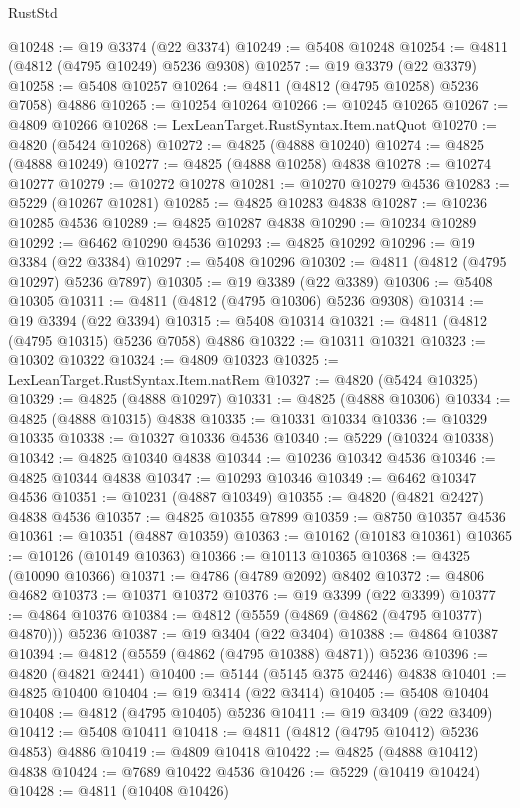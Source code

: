 \begin{lexlean}{RustStd}
\begin{coremodule}
@10248 := @19 @3374 (@22 @3374)
@10249 := @5408 @10248
@10254 := @4811 (@4812 (@4795 @10249) @5236 @9308)
@10257 := @19 @3379 (@22 @3379)
@10258 := @5408 @10257
@10264 := @4811 (@4812 (@4795 @10258) @5236 @7058) @4886
@10265 := @10254 @10264
@10266 := @10245 @10265
@10267 := @4809 @10266
@10268 := LexLeanTarget.RustSyntax.Item.natQuot
@10270 := @4820 (@5424 @10268)
@10272 := @4825 (@4888 @10240)
@10274 := @4825 (@4888 @10249)
@10277 := @4825 (@4888 @10258) @4838
@10278 := @10274 @10277
@10279 := @10272 @10278
@10281 := @10270 @10279 @4536
@10283 := @5229 (@10267 @10281)
@10285 := @4825 @10283 @4838
@10287 := @10236 @10285 @4536
@10289 := @4825 @10287 @4838
@10290 := @10234 @10289
@10292 := @6462 @10290 @4536
@10293 := @4825 @10292
@10296 := @19 @3384 (@22 @3384)
@10297 := @5408 @10296
@10302 := @4811 (@4812 (@4795 @10297) @5236 @7897)
@10305 := @19 @3389 (@22 @3389)
@10306 := @5408 @10305
@10311 := @4811 (@4812 (@4795 @10306) @5236 @9308)
@10314 := @19 @3394 (@22 @3394)
@10315 := @5408 @10314
@10321 := @4811 (@4812 (@4795 @10315) @5236 @7058) @4886
@10322 := @10311 @10321
@10323 := @10302 @10322
@10324 := @4809 @10323
@10325 := LexLeanTarget.RustSyntax.Item.natRem
@10327 := @4820 (@5424 @10325)
@10329 := @4825 (@4888 @10297)
@10331 := @4825 (@4888 @10306)
@10334 := @4825 (@4888 @10315) @4838
@10335 := @10331 @10334
@10336 := @10329 @10335
@10338 := @10327 @10336 @4536
@10340 := @5229 (@10324 @10338)
@10342 := @4825 @10340 @4838
@10344 := @10236 @10342 @4536
@10346 := @4825 @10344 @4838
@10347 := @10293 @10346
@10349 := @6462 @10347 @4536
@10351 := @10231 (@4887 @10349)
@10355 := @4820 (@4821 @2427) @4838 @4536
@10357 := @4825 @10355 @7899
@10359 := @8750 @10357 @4536
@10361 := @10351 (@4887 @10359)
@10363 := @10162 (@10183 @10361)
@10365 := @10126 (@10149 @10363)
@10366 := @10113 @10365
@10368 := @4325 (@10090 @10366)
@10371 := @4786 (@4789 @2092) @8402
@10372 := @4806 @4682
@10373 := @10371 @10372
@10376 := @19 @3399 (@22 @3399)
@10377 := @4864 @10376
@10384 := @4812 (@5559 (@4869 (@4862 (@4795 @10377) @4870))) @5236
@10387 := @19 @3404 (@22 @3404)
@10388 := @4864 @10387
@10394 := @4812 (@5559 (@4862 (@4795 @10388) @4871)) @5236
@10396 := @4820 (@4821 @2441)
@10400 := @5144 (@5145 @375 @2446) @4838
@10401 := @4825 @10400
@10404 := @19 @3414 (@22 @3414)
@10405 := @5408 @10404
@10408 := @4812 (@4795 @10405) @5236
@10411 := @19 @3409 (@22 @3409)
@10412 := @5408 @10411
@10418 := @4811 (@4812 (@4795 @10412) @5236 @4853) @4886
@10419 := @4809 @10418
@10422 := @4825 (@4888 @10412) @4838
@10424 := @7689 @10422 @4536
@10426 := @5229 (@10419 @10424)
@10428 := @4811 (@10408 @10426)

\end{coremodule}
\end{lexlean}
